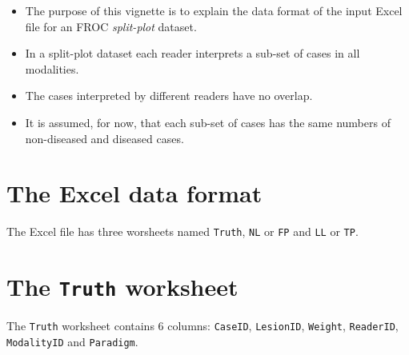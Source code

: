 \documentclass[]{book}
\providecommand{\tightlist}{%
  \setlength{\itemsep}{0pt}\setlength{\parskip}{0pt}}
\begin{document}
\begin{itemize}
\tightlist
\item
  The purpose of this vignette is to explain the data format of the input Excel file for an FROC \emph{split-plot} dataset.
\item
  In a split-plot dataset each reader interprets a sub-set of cases in all modalities.
\item
  The cases interpreted by different readers have no overlap.
\item
  It is assumed, for now, that each sub-set of cases has the same numbers of non-diseased and diseased cases.
\end{itemize}

\hypertarget{the-excel-data-format-3}{%
\section{The Excel data format}\label{the-excel-data-format-3}}

The Excel file has three worsheets named \texttt{Truth}, \texttt{NL} or \texttt{FP} and \texttt{LL} or \texttt{TP}.

\hypertarget{the-truth-worksheet-3}{%
\section{\texorpdfstring{The \texttt{Truth} worksheet}{The Truth worksheet}}\label{the-truth-worksheet-3}}

The \texttt{Truth} worksheet contains 6 columns: \texttt{CaseID}, \texttt{LesionID}, \texttt{Weight}, \texttt{ReaderID}, \texttt{ModalityID} and \texttt{Paradigm}.
\end{document}
